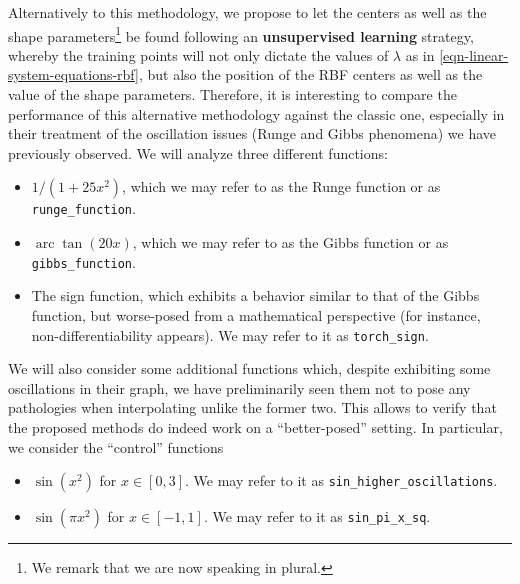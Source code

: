 \documentclass[12pt]{report} %
\newcommand{\tmop}[1]{\ensuremath{\operatorname{#1}}}
\begin{document}
Alternatively to this methodology, we propose to let the centers as well as the shape parameters\footnote{We remark that we are now speaking in plural.} be found following an \textbf{unsupervised learning} strategy, whereby the training points will not only dictate the values of $\lambda$ as in \eqref{eqn-linear-system-equations-rbf}, but also the position of the RBF centers as well as the value of the shape parameters.
Therefore, it is interesting to compare the performance of this alternative methodology against the classic one, especially in their treatment of the oscillation
issues (Runge and Gibbs phenomena) we have previously observed. We will analyze
three different functions:
\begin{itemize}
  \item $1 / (1 + 25 x^2)$, which we may refer to as the Runge function or as \texttt{runge\_function}.

  \item $\tmop{arc} \tan (20 x)$, which we may refer to as the Gibbs
        function or as \texttt{gibbs\_function}.

  \item The sign function, which exhibits a behavior similar to that of the
        Gibbs function, but worse-posed from a mathematical perspective (for
        instance, non-differentiability appears). We may refer to it as \texttt{torch\_sign}.
\end{itemize}

We will also consider some additional functions which, despite exhibiting some
oscillations in their graph, we have preliminarily seen them not to pose any
pathologies when interpolating unlike the former two. This allows to verify that
the proposed methods do indeed work on a ``better-posed'' setting. In
particular, we consider the ``control'' functions
\begin{itemize}
  \item $ \sin (x^2)$ for $x \in [0,
            3]$. We may refer to it as \texttt{sin\_higher\_oscillations}.%

  \item$ \sin (\pi x^2)$ for $x \in [- 1, 1]$. We may refer to it as \texttt{sin\_pi\_x\_sq}.%
\end{itemize}
\end{document}
